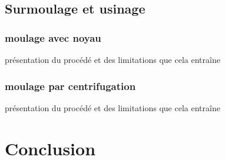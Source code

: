 \documentclass[10pt, a4paper]{article}
\begin{document}
    \subsection{Surmoulage et usinage}
        \subsubsection{moulage avec noyau}
            présentation du procédé et des limitations que cela entraîne

        \subsubsection{moulage par centrifugation}
            présentation du procédé et des limitations que cela entraîne

        
\section{Conclusion}

{}


\listoffigures
\end{document}
